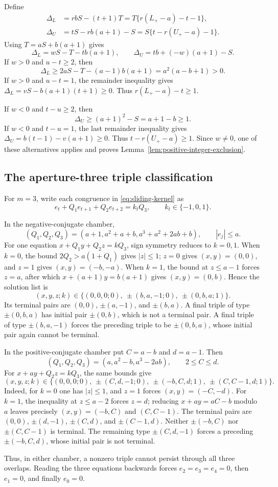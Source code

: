 Define
\begin{align*}
\Delta_L&=rbS-(t+1)T=T\{r(L_+-a)-t-1\},\\
\Delta_U&=tS-rb(a+1)-S=S\{t-r(U_+-a)-1\}.
\end{align*}
Using $T=aS+b(a+1)$ gives
\[
\Delta_L=wS-T-tb(a+1),\qquad
\Delta_U=tb+(-w)(a+1)-S.
\]
If $w>0$ and $u-t\ge2$, then
\[
\Delta_L\ge2aS-T-(a-1)b(a+1)=a^2(a-b+1)>0.
\]
If $w>0$ and $u-t=1$, the remainder inequality gives
$\Delta_L=vS-b(a+1)(t+1)\ge0$.  Thus
$r(L_+-a)-t\ge1$.

If $w<0$ and $t-u\ge2$, then
\[
\Delta_U\ge(a+1)^2-S=a+1-b\ge1.
\]
If $w<0$ and $t-u=1$, the last remainder inequality gives
$\Delta_U=b(t-1)-v(a+1)\ge0$.  Thus
$t-r(U_+-a)\ge1$.  Since $w\ne0$, one of these alternatives applies and
proves Lemma~\ref{lem:positive-integer-exclusion}.

\subsection{The aperture-three triple classification}
\label{app:m3-triples}

For $m=3$, write each congruence in \eqref{eq:sliding-kernel} as
\[
e_t+Q_1e_{t+1}+Q_2e_{t+2}=k_tQ_3,\qquad
k_t\in\{-1,0,1\}.
\]

In the negative-conjugate chamber,
\[
(Q_1,Q_2,Q_3)=(a+1,a^2+a+b,a^3+a^2+2ab+b),\qquad |e_j|\le a.
\]
For one equation $x+Q_1y+Q_2z=kQ_3$, sign symmetry reduces to $k=0,1$.
When $k=0$, the bound $2Q_2>a(1+Q_1)$ gives $|z|\le1$; $z=0$ gives
$(x,y)=(0,0)$, and $z=1$ gives $(x,y)=(-b,-a)$.  When $k=1$, the bound
at $z\le a-1$ forces $z=a$, after which
$x+(a+1)y=b(a+1)$ gives $(x,y)=(0,b)$.  Hence the solution list is
\[
(x,y,z;k)\in
\{(0,0,0;0),\ \pm(b,a,-1;0),\ \pm(0,b,a;1)\}.
\]
Its terminal pairs are $(0,0)$, $\pm(a,-1)$, and $\pm(b,a)$.  A final
triple of type $\pm(0,b,a)$ has initial pair $\pm(0,b)$, which is not a
terminal pair.  A final triple of type $\pm(b,a,-1)$ forces the preceding
triple to be $\pm(0,b,a)$, whose initial pair again cannot be terminal.

In the positive-conjugate chamber put $C=a-b$ and $d=a-1$.  Then
\[
(Q_1,Q_2,Q_3)=(a,a^2-b,a^3-2ab),\qquad 2\le C\le d.
\]
For $x+ay+Q_2z=kQ_3$, the same bounds give
\[
(x,y,z;k)\in
\{(0,0,0;0),\ \pm(C,d,-1;0),
\ \pm(-b,C,d;1),\ \pm(C,C-1,d;1)\}.
\]
Indeed, for $k=0$ one has $|z|\le1$, and $z=1$ forces
$(x,y)=(-C,-d)$.  For $k=1$, the inequality at $z\le a-2$ forces $z=d$;
reducing $x+ay=aC-b$ modulo $a$ leaves precisely
$(x,y)=(-b,C)$ and $(C,C-1)$.  The terminal pairs are
$(0,0)$, $\pm(d,-1)$, $\pm(C,d)$, and $\pm(C-1,d)$.  Neither
$\pm(-b,C)$ nor $\pm(C,C-1)$ is terminal.  The remaining type
$\pm(C,d,-1)$ forces a preceding $\pm(-b,C,d)$, whose initial pair is not
terminal.

Thus, in either chamber, a nonzero triple cannot persist through all three
overlaps.  Reading the three equations backwards forces
$e_2=e_3=e_4=0$, then $e_1=0$, and finally $e_0=0$.

